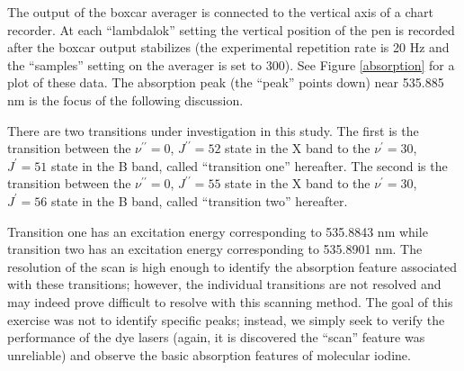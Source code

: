 \label{absorption data section}

The output of the boxcar averager is connected to the vertical axis of a chart recorder. At each ``lambdalok'' setting the vertical position of the pen is recorded after the boxcar output stabilizes (the experimental repetition rate is 20 Hz and the ``samples'' setting on the averager is set to 300). See Figure \ref{absorption} for a plot of these data. The absorption peak (the ``peak'' points down) near 535.885 nm is the focus of the following discussion.

There are two transitions under investigation in this study. The first is the transition between the $\nu^{\prime\prime}=0$, $J^{\prime\prime}=52$ state in the X band to the $\nu^{\prime}=30$, $J^{\prime}=51$ state in the B band, called ``transition one'' hereafter. The second is the transition between the $\nu^{\prime\prime}=0$, $J^{\prime\prime}=55$ state in the X band to the $\nu^{\prime}=30$, $J^{\prime}=56$ state in the B band, called ``transition two'' hereafter.

Transition one has an excitation energy corresponding to 535.8843 nm while transition two has an excitation energy corresponding to 535.8901 nm. The resolution of the scan is high enough to identify the absorption feature associated with these transitions; however, the individual transitions are not resolved and may indeed prove difficult to resolve with this scanning method. The goal of this exercise was not to identify specific peaks; instead, we simply seek to verify the performance of the dye lasers (again, it is discovered the ``scan'' feature was unreliable) and observe the basic absorption features of molecular iodine.

